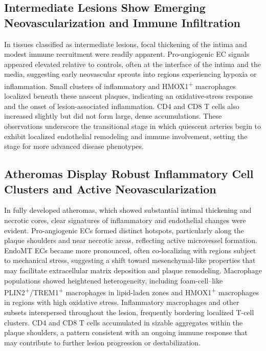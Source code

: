 \documentclass[a4paper,12pt]{article}
\begin{document}
\subsection{Intermediate Lesions Show Emerging Neovascularization and Immune Infiltration}
In tissues classified as intermediate lesions, focal thickening of the intima and modest immune recruitment were readily apparent. Pro-angiogenic EC signals appeared elevated relative to controls, often at the interface of the intima and the media, suggesting early neovascular sprouts into regions experiencing hypoxia or inflammation. Small clusters of inflammatory and HMOX1\textsuperscript{+} macrophages localized beneath these nascent plaques, indicating an oxidative-stress response and the onset of lesion-associated inflammation. CD4 and CD8 T cells also increased slightly but did not form large, dense accumulations. These observations underscore the transitional stage in which quiescent arteries begin to exhibit localized endothelial remodeling and immune involvement, setting the stage for more advanced disease phenotypes.

\subsection{Atheromas Display Robust Inflammatory Cell Clusters and Active Neovascularization}
In fully developed atheromas, which showed substantial intimal thickening and necrotic cores, clear signatures of inflammatory and endothelial changes were evident. Pro-angiogenic ECs formed distinct hotspots, particularly along the plaque shoulders and near necrotic areas, reflecting active microvessel formation. EndoMT ECs became more pronounced, often co-localizing with regions subject to mechanical stress, suggesting a shift toward mesenchymal-like properties that may facilitate extracellular matrix deposition and plaque remodeling. Macrophage populations showed heightened heterogeneity, including foam-cell–like PLIN2\textsuperscript{+}/TREM1\textsuperscript{+} macrophages in lipid-laden zones and HMOX1\textsuperscript{+} macrophages in regions with high oxidative stress. Inflammatory macrophages and other subsets interspersed throughout the lesion, frequently bordering localized T-cell clusters. CD4 and CD8 T cells accumulated in sizable aggregates within the plaque shoulders, a pattern consistent with an ongoing immune response that may contribute to further lesion progression or destabilization.
\end{document}
